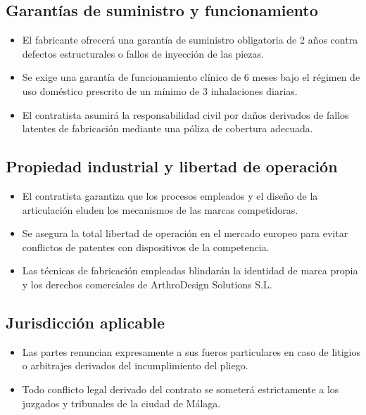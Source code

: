 \documentclass[11pt,a4paper]{article}
\begin{document}
\subsection{Garantías de suministro y funcionamiento}
\begin{itemize}
    \item El fabricante ofrecerá una garantía de suministro obligatoria de 2 años contra defectos estructurales o fallos de inyección de las piezas.
    \item Se exige una garantía de funcionamiento clínico de 6 meses bajo el régimen de uso doméstico prescrito de un mínimo de 3 inhalaciones diarias.
    \item El contratista asumirá la responsabilidad civil por daños derivados de fallos latentes de fabricación mediante una póliza de cobertura adecuada.
\end{itemize}

\subsection{Propiedad industrial y libertad de operación}
\begin{itemize}
    \item El contratista garantiza que los procesos empleados y el diseño de la articulación eluden los mecanismos de las marcas competidoras.
    \item Se asegura la total libertad de operación en el mercado europeo para evitar conflictos de patentes con dispositivos de la competencia.
    \item Las técnicas de fabricación empleadas blindarán la identidad de marca propia y los derechos comerciales de ArthroDesign Solutions S.L.
\end{itemize}

\subsection{Jurisdicción aplicable}
\begin{itemize}
    \item Las partes renuncian expresamente a sus fueros particulares en caso de litigios o arbitrajes derivados del incumplimiento del pliego.
    \item Todo conflicto legal derivado del contrato se someterá estrictamente a los juzgados y tribunales de la ciudad de Málaga.
\end{itemize}
\end{document}

